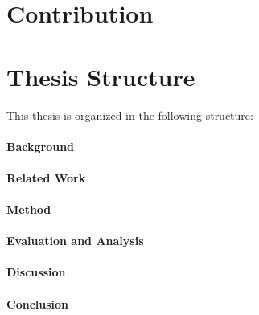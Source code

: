 \section*{Contribution}

\section*{Thesis Structure}
This thesis is organized in the following structure:\\\\
\textbf{Background}
\\\\
\textbf{Related Work}
\\\\
\textbf{Method}
\\\\
\textbf{Evaluation and Analysis}
\\\\
\textbf{Discussion}
\\\\
\textbf{Conclusion}